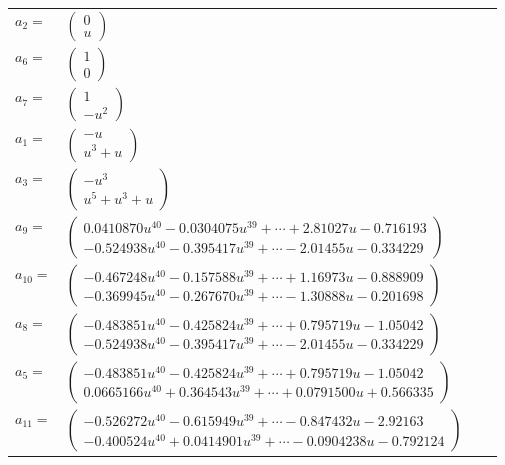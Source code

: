 \documentclass[1p]{elsarticle_modified}
\theoremstyle{definition}
\begin{document}
\begin{tabular}{m{7pt} m{180pt} m{7pt} m{180pt} }
\flushright $a_{2}=$&$\begin{pmatrix}0\\u\end{pmatrix}$ \\
\flushright $a_{6}=$&$\begin{pmatrix}1\\0\end{pmatrix}$ \\
\flushright $a_{7}=$&$\begin{pmatrix}1\\- u^2\end{pmatrix}$ \\
\flushright $a_{1}=$&$\begin{pmatrix}- u\\u^3+u\end{pmatrix}$ \\
\flushright $a_{3}=$&$\begin{pmatrix}- u^3\\u^5+u^3+u\end{pmatrix}$ \\
\flushright $a_{9}=$&$\begin{pmatrix}0.0410870 u^{40}-0.0304075 u^{39}+\cdots+2.81027 u-0.716193\\-0.524938 u^{40}-0.395417 u^{39}+\cdots-2.01455 u-0.334229\end{pmatrix}$ \\
\flushright $a_{10}=$&$\begin{pmatrix}-0.467248 u^{40}-0.157588 u^{39}+\cdots+1.16973 u-0.888909\\-0.369945 u^{40}-0.267670 u^{39}+\cdots-1.30888 u-0.201698\end{pmatrix}$ \\
\flushright $a_{8}=$&$\begin{pmatrix}-0.483851 u^{40}-0.425824 u^{39}+\cdots+0.795719 u-1.05042\\-0.524938 u^{40}-0.395417 u^{39}+\cdots-2.01455 u-0.334229\end{pmatrix}$ \\
\flushright $a_{5}=$&$\begin{pmatrix}-0.483851 u^{40}-0.425824 u^{39}+\cdots+0.795719 u-1.05042\\0.0665166 u^{40}+0.364543 u^{39}+\cdots+0.0791500 u+0.566335\end{pmatrix}$ \\
\flushright $a_{11}=$&$\begin{pmatrix}-0.526272 u^{40}-0.615949 u^{39}+\cdots-0.847432 u-2.92163\\-0.400524 u^{40}+0.0414901 u^{39}+\cdots-0.0904238 u-0.792124\end{pmatrix}$ \\

\end{tabular}
\end{document}
